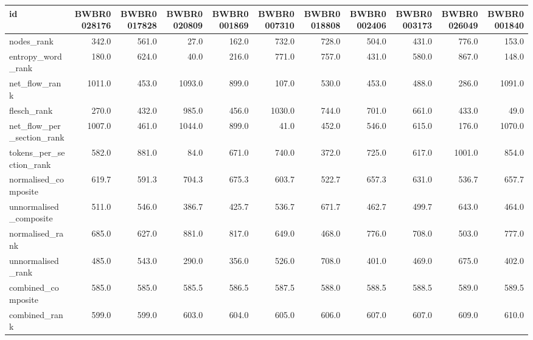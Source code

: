 \begin{tabular}{lrrrrrrrrrr}
\toprule
id & BWBR0028176 & BWBR0017828 & BWBR0020809 & BWBR0001869 & BWBR0007310 & BWBR0018808 & BWBR0002406 & BWBR0003173 & BWBR0026049 & BWBR0001840 \\
\midrule
nodes\_rank & 342.0 & 561.0 & 27.0 & 162.0 & 732.0 & 728.0 & 504.0 & 431.0 & 776.0 & 153.0 \\
\cline{1-11}
entropy\_word\_rank & 180.0 & 624.0 & 40.0 & 216.0 & 771.0 & 757.0 & 431.0 & 580.0 & 867.0 & 148.0 \\
\cline{1-11}
net\_flow\_rank & 1011.0 & 453.0 & 1093.0 & 899.0 & 107.0 & 530.0 & 453.0 & 488.0 & 286.0 & 1091.0 \\
\cline{1-11}
flesch\_rank & 270.0 & 432.0 & 985.0 & 456.0 & 1030.0 & 744.0 & 701.0 & 661.0 & 433.0 & 49.0 \\
\cline{1-11}
net\_flow\_per\_section\_rank & 1007.0 & 461.0 & 1044.0 & 899.0 & 41.0 & 452.0 & 546.0 & 615.0 & 176.0 & 1070.0 \\
\cline{1-11}
tokens\_per\_section\_rank & 582.0 & 881.0 & 84.0 & 671.0 & 740.0 & 372.0 & 725.0 & 617.0 & 1001.0 & 854.0 \\
\cline{1-11}
normalised\_composite & 619.7 & 591.3 & 704.3 & 675.3 & 603.7 & 522.7 & 657.3 & 631.0 & 536.7 & 657.7 \\
\cline{1-11}
unnormalised\_composite & 511.0 & 546.0 & 386.7 & 425.7 & 536.7 & 671.7 & 462.7 & 499.7 & 643.0 & 464.0 \\
\cline{1-11}
normalised\_rank & 685.0 & 627.0 & 881.0 & 817.0 & 649.0 & 468.0 & 776.0 & 708.0 & 503.0 & 777.0 \\
\cline{1-11}
unnormalised\_rank & 485.0 & 543.0 & 290.0 & 356.0 & 526.0 & 708.0 & 401.0 & 469.0 & 675.0 & 402.0 \\
\cline{1-11}
combined\_composite & 585.0 & 585.0 & 585.5 & 586.5 & 587.5 & 588.0 & 588.5 & 588.5 & 589.0 & 589.5 \\
\cline{1-11}
combined\_rank & 599.0 & 599.0 & 603.0 & 604.0 & 605.0 & 606.0 & 607.0 & 607.0 & 609.0 & 610.0 \\
\cline{1-11}
\bottomrule
\end{tabular}

